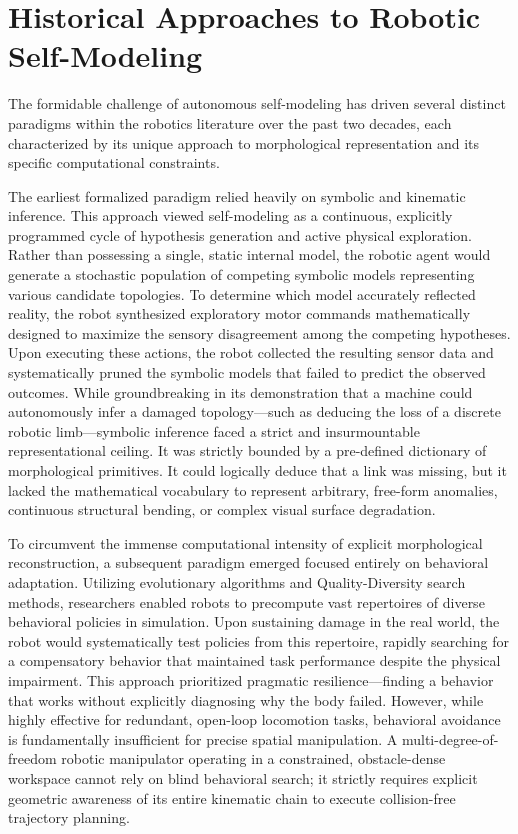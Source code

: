 \documentclass[12pt,a4paper,oneside]{report}
\begin{document}
\section{Historical Approaches to Robotic Self-Modeling}

The formidable challenge of autonomous self-modeling has driven several distinct paradigms within the robotics literature over the past two decades, each characterized by its unique approach to morphological representation and its specific computational constraints. 

The earliest formalized paradigm relied heavily on symbolic and kinematic inference. This approach viewed self-modeling as a continuous, explicitly programmed cycle of hypothesis generation and active physical exploration. Rather than possessing a single, static internal model, the robotic agent would generate a stochastic population of competing symbolic models representing various candidate topologies. To determine which model accurately reflected reality, the robot synthesized exploratory motor commands mathematically designed to maximize the sensory disagreement among the competing hypotheses. Upon executing these actions, the robot collected the resulting sensor data and systematically pruned the symbolic models that failed to predict the observed outcomes. While groundbreaking in its demonstration that a machine could autonomously infer a damaged topology—such as deducing the loss of a discrete robotic limb—symbolic inference faced a strict and insurmountable representational ceiling. It was strictly bounded by a pre-defined dictionary of morphological primitives. It could logically deduce that a link was missing, but it lacked the mathematical vocabulary to represent arbitrary, free-form anomalies, continuous structural bending, or complex visual surface degradation.

To circumvent the immense computational intensity of explicit morphological reconstruction, a subsequent paradigm emerged focused entirely on behavioral adaptation. Utilizing evolutionary algorithms and Quality-Diversity search methods, researchers enabled robots to precompute vast repertoires of diverse behavioral policies in simulation. Upon sustaining damage in the real world, the robot would systematically test policies from this repertoire, rapidly searching for a compensatory behavior that maintained task performance despite the physical impairment. This approach prioritized pragmatic resilience—finding a behavior that works without explicitly diagnosing why the body failed. However, while highly effective for redundant, open-loop locomotion tasks, behavioral avoidance is fundamentally insufficient for precise spatial manipulation. A multi-degree-of-freedom robotic manipulator operating in a constrained, obstacle-dense workspace cannot rely on blind behavioral search; it strictly requires explicit geometric awareness of its entire kinematic chain to execute collision-free trajectory planning.
\end{document}
